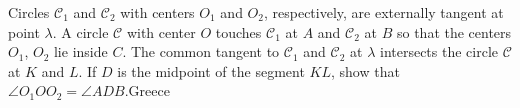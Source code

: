 Circles $\mathcal C_1$ and $\mathcal C_2$ with centers $O_1$ and $O_2$,  respectively, are externally tangent at point $\lambda$. A circle $\mathcal C$ with center $O$ touches $\mathcal C_1$ at $A$ and $\mathcal C_2$ at $B$ so that the centers $O_1$,  $O_2$ lie inside $C$. The common tangent to $\mathcal C_1$ and $\mathcal C_2$ at $\lambda$ intersects the circle $\mathcal C$ at $K$ and $L$. If $D$ is the midpoint of the segment $KL$,  show that $\angle O_1OO_2 = \angle ADB$.Greece